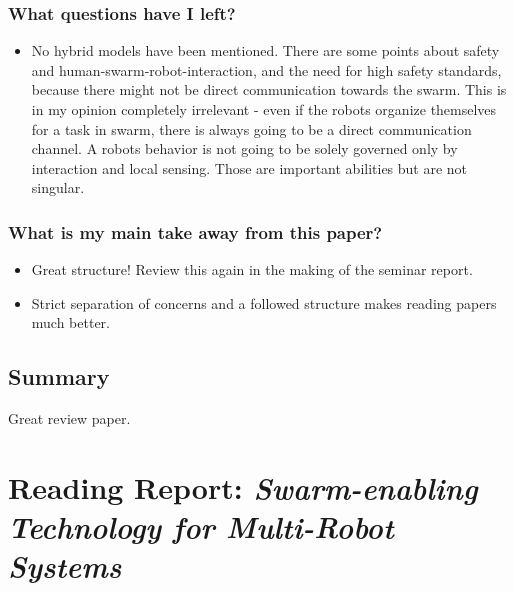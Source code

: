     \subsubsection*{What questions have I left?}
    \begin{itemize}
        \item No hybrid models have been mentioned. There are some points about safety and human-swarm-robot-interaction, and the need for high safety standards, because there might not be direct communication towards the swarm. This is in my opinion completely irrelevant - even if the robots organize themselves for a task in swarm, there is always going to be a direct communication channel. A robots behavior is not going to be solely governed only by interaction and local sensing. Those are important abilities but are not singular.    
    \end{itemize}
    \subsubsection*{What is my main take away from this paper?}
    \begin{itemize}
        \item Great structure! Review this again in the making of the seminar report. 
        \item Strict separation of concerns and a followed structure makes reading papers much better.
    \end{itemize}
    
    \subsection*{Summary}
    Great review paper.
    

    \newpage
    
    \section{Reading Report: \emph{Swarm-enabling Technology for Multi-Robot Systems}}
    \label{sec:Chamanbaz2017}
    \cite{Chamanbaz2017}
    
